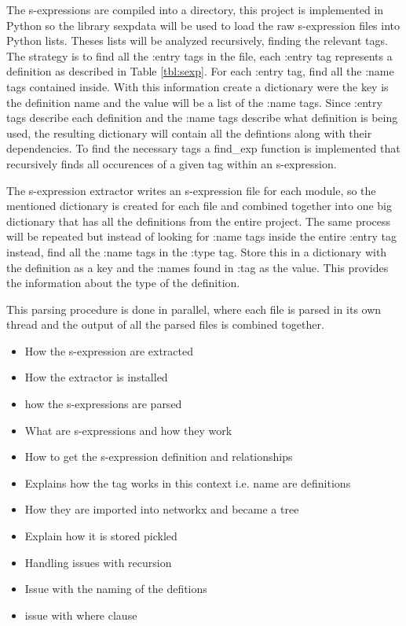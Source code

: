
The s-expressions are compiled into a directory, this project is implemented in
Python so the library sexpdata will be used to load the raw s-expression files
into Python lists. Theses lists will be analyzed recursively, finding the
relevant tags. The strategy is to find all the :entry tags in the file, each
:entry tag represents a definition as described in Table \ref{tbl:sexp}. For
each :entry tag, find all the :name tags contained inside. With this
information create a dictionary were the key is the definition name and the
value will be a list of the :name tags. Since :entry tags describe each
definition and the :name tags describe what definition is being used, the
resulting dictionary will contain all the defintions along with their
dependencies. To find the necessary tags a \textsf{find\_exp} function is
implemented that recursively finds all occurences of a given tag within an
s-expression.

The s-expression extractor writes an s-expression file for each module, so the
mentioned dictionary is created for each file and combined together into one
big dictionary that has all the definitions from the entire project. The same
process will be repeated but instead of looking for :name tags inside the
entire :entry tag instead, find all the :name tags in the :type tag. Store this
in a dictionary with the definition as a key and the :names found in :tag as
the value. This provides the information about the type of the definition.

This parsing procedure is done in parallel, where each file is parsed in its
own thread and the output of all the parsed files is combined together.

\begin{itemize}
    \item How the s-expression are extracted
    \item How the extractor is installed
    \item how the s-expressions are parsed
    \item What are s-expressions and how they work
    \item How to get the s-expression definition and relationships
    \item Explains how the tag works in this context i.e. name are definitions 
    \item How they are imported into networkx and became a tree
    \item Explain how it is stored pickled 
    \item Handling issues with recursion 
    \item Issue with the naming of the defitions 
    \item issue with where clause
\end{itemize}

